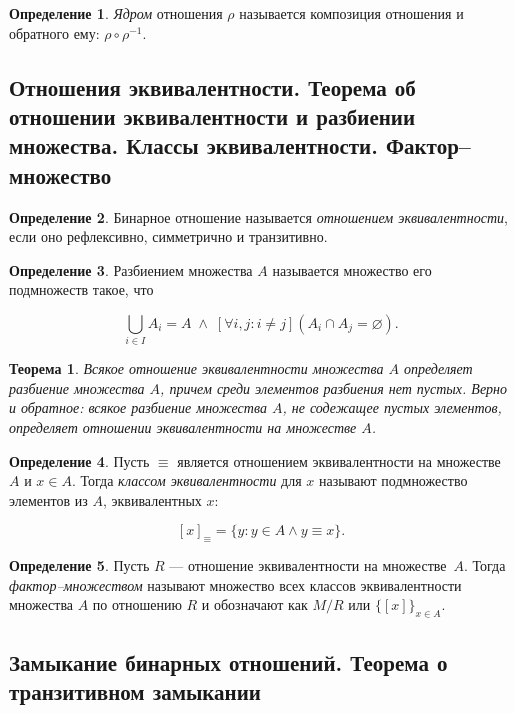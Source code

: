 \documentclass{article}
\newtheorem*{theorem*}{Теорема}
\theoremstyle{plain}
\theoremstyle{definition}
\newtheorem{definition}{Определение}[subsection]
\begin{document}
\begin{definition}
	\textit{Ядром} отношения \(\rho\) называется композиция отношения и обратного ему: \(\rho \circ \rho^{-1}\).
\end{definition}

\subsection{Отношения эквивалентности. Теорема об отношении эквивалентности и разбиении множества. Классы эквивалентности. Фактор–множество}

\begin{definition}
	Бинарное отношение называется \textit{отношением эквивалентности}, если оно рефлексивно, симметрично и транзитивно.
\end{definition}

\begin{definition}
	Разбиением множества \(A\) называется множество его подмножеств такое, что

	\[
		\bigcup \limits _{{i \in I}}A_{i} = A \;\land\; [\forall i, j \colon i \neq j] (A_i \cap A_j = \varnothing).
	\]
\end{definition}

\begin{theorem*}
	Всякое отношение эквивалентности множества \(A\) определяет разбиение множества \(A\), причем среди элементов разбиения нет пустых. Верно и обратное: всякое разбиение множества \(A\), не содежащее пустых элементов, определяет отношении эквивалентности на множестве \(A\).
\end{theorem*}

\begin{definition}
	Пусть \(\equiv\) является отношением эквивалентности на множестве \(A\) и \(x \in A\). Тогда \textit{классом эквивалентности} для \(x\) называют подмножество элементов из \(A\), эквивалентных \(x\):

	\[
		[x]_{\equiv} = \{ y \colon y \in A \land y \equiv x \}.
	\]
\end{definition}

\begin{definition}
	Пусть \(R\) — отношение эквивалентности на множестве~\(A\). Тогда \textit{фактор–множеством} называют множество всех классов эквивалентности множества \(A\) по отношению \(R\) и обозначают как \(M / R\) или \(\{ [x] \}_{x \in A}\).
\end{definition}

\subsection{Замыкание бинарных отношений. Теорема о транзитивном замыкании}
\end{document}
